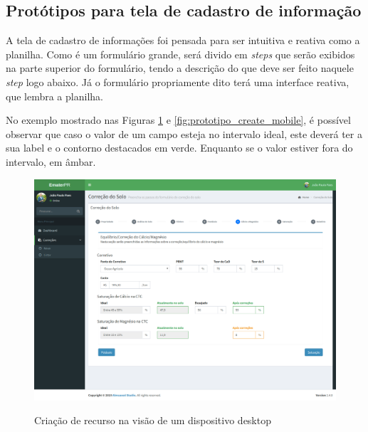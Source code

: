 \subsection{Protótipos para tela de cadastro de informação}
\label{sec:titSecPrototiposCreate}

A tela de cadastro de informações foi pensada para ser intuitiva e reativa como a planilha. Como é um formulário grande, será divido em \textit{steps} que serão exibidos na parte superior do formulário, tendo a descrição do que deve ser feito naquele \textit{step} logo abaixo. Já o formulário propriamente dito terá uma interface reativa, que lembra a planilha.

No exemplo mostrado nas Figuras \ref{fig:prototipo_create_desk} e \ref{fig:prototipo_create_mobile}, é possível observar que caso o valor de um campo esteja no intervalo ideal, este deverá ter a sua label e o contorno destacados em verde. Enquanto se o valor estiver fora do intervalo, em âmbar. 

\begin{figure}[H]
    \centering
    \caption{Criação de recurso na visão de um dispositivo desktop}
    \includegraphics[width=13cm]{./dados/figuras/prototipos/create_desktop.png}
    \label{fig:prototipo_create_desk}
\end{figure}

